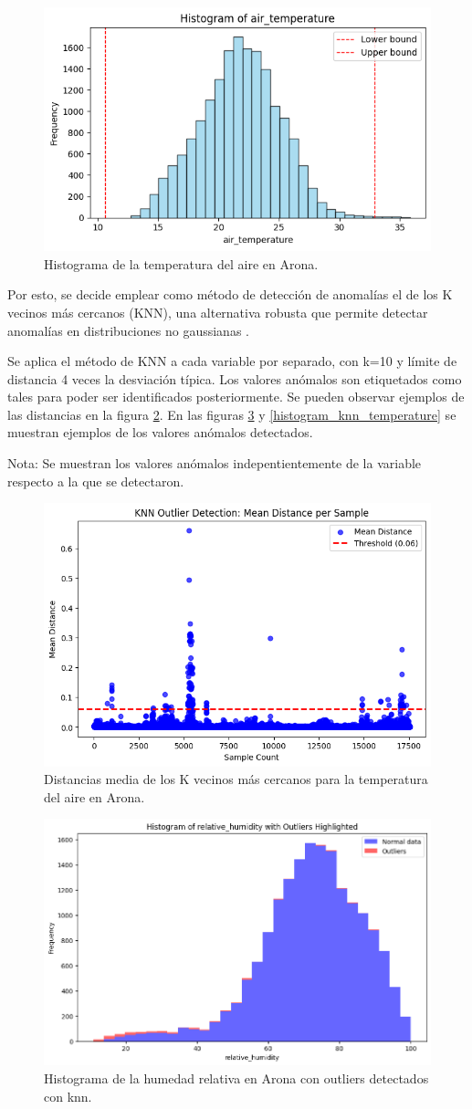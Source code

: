 \begin{figure}
    \centering
    \includegraphics[width=.5\linewidth]{images/histogram_temperature.png}
    \caption{Histograma de la temperatura del aire en Arona.}
    \label{histogram_2}
\end{figure}

Por esto, se decide emplear como método de detección de anomalías el de los K vecinos más cercanos (KNN), 
una alternativa robusta que permite detectar anomalías en distribuciones no gaussianas \cite{gu2019}.

Se aplica el método de KNN a cada variable por separado, con k=10 y límite de distancia 4 veces la desviación típica. 
Los valores anómalos son etiquetados como tales para poder ser identificados posteriormente. Se pueden observar ejemplos 
de las distancias en la figura \ref{knn_distances}. En las figuras \ref{histogram_knn_humidity} y \ref{histogram_knn_temperature} se muestran ejemplos de los valores anómalos detectados. 

Nota: Se muestran los valores anómalos indepentientemente de la variable respecto a la que se detectaron.

\begin{figure}
    \centering
    \includegraphics[width=.5\linewidth]{images/knn_distances_temperature_arona.png}
    \caption{Distancias media de los K vecinos más cercanos para la temperatura del aire en Arona.}
    \label{knn_distances}
\end{figure}

\begin{figure}
    \centering
    \includegraphics[width=.5\linewidth]{images/histogram_humidity_knn.png}
    \caption{Histograma de la humedad relativa en Arona con outliers detectados con knn.}
    \label{histogram_knn_humidity}
\end{figure}

